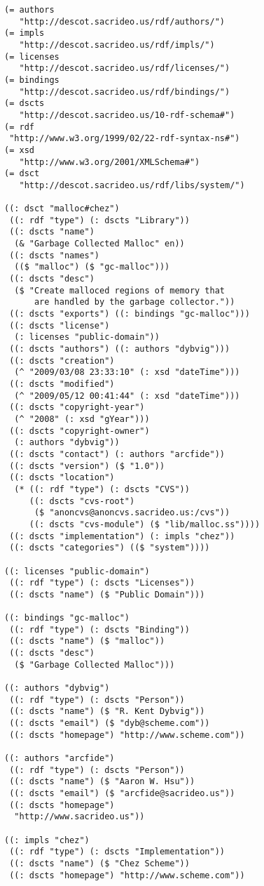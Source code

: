 \documentclass[9pt,cm,twocolumn,preprint]{sigplanconf}
\begin{document}
\begin{verbatim}
(= authors 
   "http://descot.sacrideo.us/rdf/authors/")
(= impls 
   "http://descot.sacrideo.us/rdf/impls/")
(= licenses 
   "http://descot.sacrideo.us/rdf/licenses/")
(= bindings 
   "http://descot.sacrideo.us/rdf/bindings/")
(= dscts 
   "http://descot.sacrideo.us/10-rdf-schema#")
(= rdf 
 "http://www.w3.org/1999/02/22-rdf-syntax-ns#")
(= xsd 
   "http://www.w3.org/2001/XMLSchema#")
(= dsct 
   "http://descot.sacrideo.us/rdf/libs/system/")

((: dsct "malloc#chez")
 ((: rdf "type") (: dscts "Library"))
 ((: dscts "name") 
  (& "Garbage Collected Malloc" en))
 ((: dscts "names") 
  (($ "malloc") ($ "gc-malloc")))
 ((: dscts "desc") 
  ($ "Create malloced regions of memory that 
      are handled by the garbage collector."))
 ((: dscts "exports") ((: bindings "gc-malloc")))
 ((: dscts "license") 
  (: licenses "public-domain"))
 ((: dscts "authors") ((: authors "dybvig")))
 ((: dscts "creation") 
  (^ "2009/03/08 23:33:10" (: xsd "dateTime")))
 ((: dscts "modified") 
  (^ "2009/05/12 00:41:44" (: xsd "dateTime")))
 ((: dscts "copyright-year") 
  (^ "2008" (: xsd "gYear")))
 ((: dscts "copyright-owner") 
  (: authors "dybvig"))
 ((: dscts "contact") (: authors "arcfide"))
 ((: dscts "version") ($ "1.0"))
 ((: dscts "location") 
  (* ((: rdf "type") (: dscts "CVS"))
     ((: dscts "cvs-root") 
      ($ "anoncvs@anoncvs.sacrideo.us:/cvs"))
     ((: dscts "cvs-module") ($ "lib/malloc.ss"))))
 ((: dscts "implementation") (: impls "chez"))
 ((: dscts "categories") (($ "system"))))

((: licenses "public-domain")
 ((: rdf "type") (: dscts "Licenses"))
 ((: dscts "name") ($ "Public Domain")))

((: bindings "gc-malloc")
 ((: rdf "type") (: dscts "Binding"))
 ((: dscts "name") ($ "malloc"))
 ((: dscts "desc") 
  ($ "Garbage Collected Malloc")))

((: authors "dybvig") 
 ((: rdf "type") (: dscts "Person"))
 ((: dscts "name") ($ "R. Kent Dybvig"))
 ((: dscts "email") ($ "dyb@scheme.com"))
 ((: dscts "homepage") "http://www.scheme.com"))

((: authors "arcfide")
 ((: rdf "type") (: dscts "Person"))
 ((: dscts "name") ($ "Aaron W. Hsu"))
 ((: dscts "email") ($ "arcfide@sacrideo.us"))
 ((: dscts "homepage") 
  "http://www.sacrideo.us"))

((: impls "chez")
 ((: rdf "type") (: dscts "Implementation"))
 ((: dscts "name") ($ "Chez Scheme"))
 ((: dscts "homepage") "http://www.scheme.com"))
\end{verbatim}
\medskip
\end{document}
